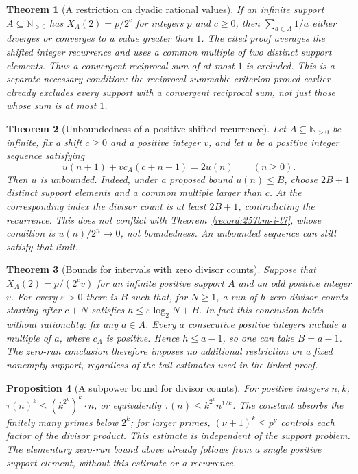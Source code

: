 \documentclass[11pt]{article}
\theoremstyle{plain}
\newtheorem{thm}{Theorem}[section]
\newtheorem{prop}[thm]{Proposition}
\theoremstyle{definition}
\theoremstyle{remark}
\newcommand{\Npos}{\mathbb{N}_{>0}}
\begin{document}
\begin{thm}[A restriction on dyadic rational values]\label{record:257rig-i2}
If an infinite support $A\subseteq\Npos$ has $X_A(2)=p/2^c$ for
integers $p$ and $c\ge0$, then $\sum_{a\in A}1/a$ either diverges or
converges to a value greater than $1$. The cited proof averages the
shifted integer recurrence and uses a common multiple of two distinct
support elements. Thus a convergent reciprocal sum of at most $1$ is
excluded. This is a separate necessary condition: the reciprocal-summable
criterion proved earlier already excludes every support with a convergent
reciprocal sum, not just those whose sum is at most $1$.
\end{thm}

\begin{thm}[Unboundedness of a positive shifted recurrence]\label{record:257rig-i3}
Let $A\subseteq\Npos$ be infinite, fix a shift $c\ge0$ and a positive
integer $v$, and let $u$ be a positive integer sequence satisfying
\[
 u(n+1)+v c_A(c+n+1)=2u(n)\qquad(n\ge0).
\]
Then $u$ is unbounded. Indeed, under a proposed bound $u(n)\le B$,
choose $2B+1$ distinct support elements and a common multiple larger
than $c$. At the corresponding index the divisor count is at least
$2B+1$, contradicting the recurrence. This does not conflict with
Theorem~\ref{record:257bm-i-t7}, whose condition is $u(n)/2^n\to0$,
not boundedness. An unbounded sequence can still satisfy that limit.
\end{thm}

\begin{thm}[Bounds for intervals with zero divisor counts]\label{record:257rig-i4a}
Suppose that $X_A(2)=p/(2^cv)$ for an infinite positive support $A$
and an odd positive integer $v$. For every $\varepsilon>0$ there is
$B$ such that, for $N\ge1$, a run of $h$ zero divisor counts starting
after $c+N$ satisfies $h\le\varepsilon\log_2N+B$.
In fact this conclusion holds without rationality: fix any $a\in A$.
Every $a$ consecutive positive integers include a multiple of $a$, where
$c_A$ is positive. Hence $h\le a-1$, so one can take $B=a-1$.
The zero-run conclusion therefore imposes no additional restriction on
a fixed nonempty support, regardless of the tail estimates used in the
linked proof.
\end{thm}

\begin{prop}[A subpower bound for divisor counts]\label{record:257rig-i4b}
For positive integers $n,k$,
$\tau(n)^k \le (k^{2^k})^k\cdot n$, or equivalently
$\tau(n)\le k^{2^k}n^{1/k}$. The constant absorbs the finitely many primes
below $2^k$; for larger primes, $(\nu+1)^k\le p^\nu$ controls each factor
of the divisor product. This estimate is independent of the support
problem. The elementary zero-run bound above already follows from a
single positive support element, without this estimate or a recurrence.
\end{prop}
\end{document}
